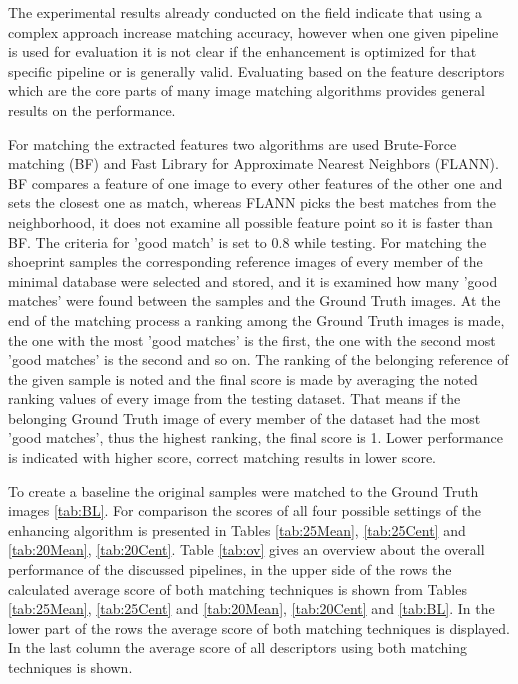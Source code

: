\documentclass[draft,final]{vutinfth} %
\begin{document}
The experimental results already conducted on the field indicate \cite{rida2019forensic} that using a complex approach increase matching accuracy, however when one given pipeline is used for evaluation it is not clear if the enhancement is optimized for that specific pipeline or is generally valid.
Evaluating based on the feature descriptors which are the core parts of many image matching algorithms provides general results on the performance.
\par
For matching the extracted features two algorithms are used Brute-Force matching (BF) and Fast Library for Approximate Nearest Neighbors (FLANN).
BF compares a feature of one image to every other features of the other one and sets the closest one as match, whereas FLANN picks the best matches from the neighborhood, it does not examine all possible feature point so it is faster than BF.
The criteria for 'good match' is set to 0.8 while testing.
For matching the shoeprint samples the corresponding reference images of every member of the minimal database were selected and stored, and it is examined how many 'good matches' were found between the samples and the Ground Truth images.
At the end of the matching process a ranking among the Ground Truth images is made, the one with the most 'good matches' is the first, the one with the second most 'good matches' is the second and so on.
The ranking of the belonging reference of the given sample is noted and the final score is made by averaging the noted ranking values  of every image from the testing dataset.
That means if the belonging Ground Truth image of every member of the dataset had the most 'good matches', thus the highest ranking, the final score is 1.
Lower performance is indicated with higher score, correct matching results in lower score.
\par
To create a baseline the original samples were matched to the Ground Truth images \ref{tab:BL}.
For comparison the scores of all four possible settings of the enhancing algorithm is presented in Tables \ref{tab:25Mean}, \ref{tab:25Cent} and \ref{tab:20Mean}, \ref{tab:20Cent}.
Table \ref{tab:ov} gives an overview about the overall performance of the discussed pipelines, in the upper side of the rows the calculated average score of both matching techniques is shown from Tables \ref{tab:25Mean}, \ref{tab:25Cent} and \ref{tab:20Mean}, \ref{tab:20Cent} and \ref{tab:BL}.
In the lower part of the rows the average score of both matching techniques is displayed.
In the last column the average score of all descriptors using both matching techniques is shown.
\end{document}
